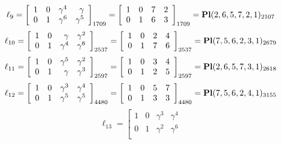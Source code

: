 \documentclass{article}
\begin{document}
{$$
\ell_{9} = 
\left[
\begin{array}{*{4}{r}}
1 & 0 & \gamma^{4} & \gamma \\
0 & 1 & \gamma^{6} & \gamma^{5}\\
\end{array}
\right]
_{1709}
=
\left[
\begin{array}{*{4}c}
1  & 0  & 7  & 2\\
0  & 1  & 6  & 3\\
\end{array}
\right]_{1709}
={\rm\bf Pl}(2,6,5,7,2,1 )_{2107}$$
$$
\ell_{10} = 
\left[
\begin{array}{*{4}{r}}
1 & 0 & \gamma  & \gamma^{2}\\
0 & 1 & \gamma^{4} & \gamma^{6}\\
\end{array}
\right]
_{2537}
=
\left[
\begin{array}{*{4}c}
1  & 0  & 2  & 4\\
0  & 1  & 7  & 6\\
\end{array}
\right]_{2537}
={\rm\bf Pl}(7,5,6,2,3,1 )_{2679}$$
$$
\ell_{11} = 
\left[
\begin{array}{*{4}{r}}
1 & 0 & \gamma^{5} & \gamma^{2}\\
0 & 1 & \gamma  & \gamma^{3}\\
\end{array}
\right]
_{2597}
=
\left[
\begin{array}{*{4}c}
1  & 0  & 3  & 4\\
0  & 1  & 2  & 5\\
\end{array}
\right]_{2597}
={\rm\bf Pl}(2,6,5,7,3,1 )_{2618}$$
$$
\ell_{12} = 
\left[
\begin{array}{*{4}{r}}
1 & 0 & \gamma^{3} & \gamma^{4}\\
0 & 1 & \gamma^{5} & \gamma^{5}\\
\end{array}
\right]
_{4480}
=
\left[
\begin{array}{*{4}c}
1  & 0  & 5  & 7\\
0  & 1  & 3  & 3\\
\end{array}
\right]_{4480}
={\rm\bf Pl}(7,5,6,2,4,1 )_{3155}$$
$$
\ell_{13} = 
\left[
\begin{array}{*{4}{r}}
1 & 0 & \gamma^{3} & \gamma^{4}\\
0 & 1 & \gamma^{2} & \gamma^{6}\\
\end{array}
$$}
\end{document}
